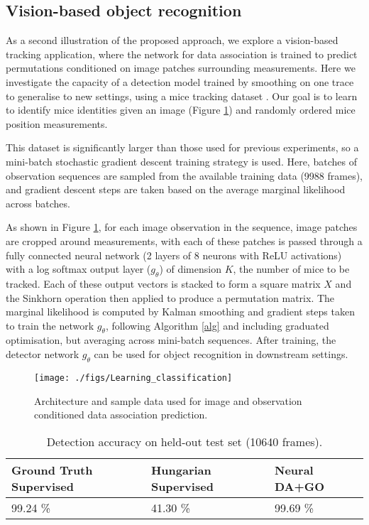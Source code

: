\documentclass[journal]{IEEEtran}
\begin{document}
\subsection{Vision-based object recognition}

As a second illustration of the proposed approach, we explore a vision-based tracking application, where the network for data association is trained to predict permutations conditioned on image patches surrounding measurements. Here we investigate the capacity of a detection model trained by smoothing on one trace to generalise to new settings, using a mice tracking dataset \cite{10.1371/journal.pone.0074557}. Our goal is to learn to identify mice identities given an image (Figure \ref{fig:arch}) and randomly ordered mice position measurements. 

This dataset is significantly larger than those used for previous experiments, so a mini-batch stochastic gradient descent training strategy is used. Here, batches of observation sequences are sampled from the available training data (9988 frames), and gradient descent steps are taken based on the average marginal likelihood across batches.

As shown in Figure \ref{fig:arch}, for each image observation in the sequence, image patches are cropped around measurements, with each of these patches is passed through a fully connected neural network (2 layers of 8 neurons with ReLU activations) with a log softmax output layer ($g_\theta$) of dimension $K$, the number of mice to be tracked. Each of these output vectors is stacked to form a square matrix $X$ and the Sinkhorn operation then applied to produce a permutation matrix. The marginal likelihood is computed by Kalman smoothing \cite{rauch1965maximum} and gradient steps taken to train the network $g_\theta$, following Algorithm \ref{alg} and including graduated optimisation, but averaging across mini-batch sequences. After training, the detector network $g_\theta$ can be used for object recognition in downstream settings.
\begin{figure}
    \centering
    \texttt{[image: ./figs/Learning\_classification]}
    \caption{Architecture and sample data used for image and observation conditioned data association prediction.}
    \label{fig:arch}
\end{figure}
\begin{table}
    \centering
    \caption{Detection accuracy on held-out test set (10640 frames).    \label{tab:mice_results}}
    \begin{tabular}{l|l|l}
        \hline
        Ground Truth Supervised & Hungarian Supervised & Neural DA+GO\\ 
        \hline
         99.24 \% & 41.30 \% & 99.69 \% \\
         \hline
    \end{tabular}
\end{table}
\end{document}
